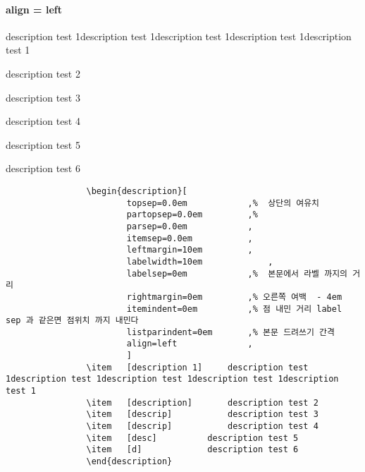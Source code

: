			\paragraph{ align = left }
				\begin{description}[
						topsep=0.0em 			,%
						partopsep=0.0em 		,%
						parsep=0.0em 			, 
						itemsep=0.0em 			, 
						leftmargin=10em 		,
						labelwidth=10em 			, 
						labelsep=0em 			,%
						rightmargin=0em 		,%
						itemindent=0em 			,%
						listparindent=0em 		,%
						align=left				,
						]
				\item	[description 1]		description test 1description test 1description test 1description test 1description test 1
				\item	[description]		description test 2
				\item	[descrip]			description test 3
				\item	[descrip]			description test 4
				\item	[desc]			description test 5
				\item	[d]				description test 6
				\end{description}
	
		\begin{mdframed}[style=code_document, frametitle={code}]
			\begin{verbatim}
				\begin{description}[
						topsep=0.0em 			,%  상단의 여유치
						partopsep=0.0em 		,%  
						parsep=0.0em 			, 
						itemsep=0.0em 			, 
						leftmargin=10em 		,
						labelwidth=10em 			, 
						labelsep=0em 			,%  본문에서 라벨 까지의 거리
						rightmargin=0em 		,% 오른쪽 여백  - 4em
						itemindent=0em 			,% 점 내민 거리 label sep 과 같은면 점위치 까지 내민다
						listparindent=0em 		,% 본문 드려쓰기 간격
						align=left				,
						]
				\item	[description 1]		description test 1description test 1description test 1description test 1description test 1
				\item	[description]		description test 2
				\item	[descrip]			description test 3
				\item	[descrip]			description test 4
				\item	[desc]			description test 5
				\item	[d]				description test 6
				\end{description}
			\end{verbatim}
		\end{mdframed}


